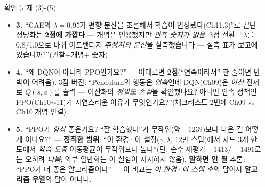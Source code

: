 \documentclass[aspectratio=169,11pt]{beamer}
\begin{document}
\begin{frame}{확인 문제 (3)-(5)}
  \small
  \begin{itemize}
    \item \textbf{3.} ``GAE의 $\lambda=0.95$가 편향-분산을 조절해서
      학습이 안정됐다(Ch11.3)''로 끝난 정당화는 \textbf{2점에
      가깝다} — 개념은 인용했지만 \emph{관측 숫자가 없음}. 3점
      전환: ``$\lambda$를 0.8/1.0으로 바꿔 어드밴티지 \emph{추정치의
      분산}을 실측했습니다 — 실측 표가 보고에 있습니까?''(관찰+개념+
      숫자).
    \item \textbf{4.} ``왜 DQN이 아니라 PPO인가요?'' — 이대로면
      \textbf{2점}(``연속이라서'' 한 줄이면 반박이 어려움). 3점
      버전: ``Pendulum의 행동은 \emph{연속}인데 DQN(Ch09)은 \emph{이산}
      전제로 $Q(s,a)$를 출력 — 이산화의 \emph{정밀도 손실}을 확인했나요?
      아니면 연속 정책인 PPO(Ch10$\sim$11)가 자연스러운 이유가
      무엇인가요?''(체크리스트 2번에 Ch09 vs Ch10 개념 연결).
    \item \textbf{5.} ``PPO가 \emph{항상} 좋은가요? ``잘 학습했다''가
      무작위(약 $-1239$)보다 나은 걸 어떻게 아나요?'' — \textbf{정직한
      범위}: ``이 환경·이 설정($\gamma, \lambda$, 12만 스텝)에서 시드 3개
      한도에서 \emph{학습 도중} 이동평균이 무작위보다 높다''(단, 순수
      재평가 $-1413/-1491$로는 오히려 \emph{나쁨}; 외부 일반화는 이
      실험이 지지하지 않음). \textbf{말하면 안 될} 추론: ``PPO가 더 좋은
      알고리즘이다'' — 이 비교는 \emph{이 환경·이 스텝 수}의 답이지
      \textbf{알고리즘 우열}의 답이 아니다.
  \end{itemize}
\end{frame}
\end{document}
